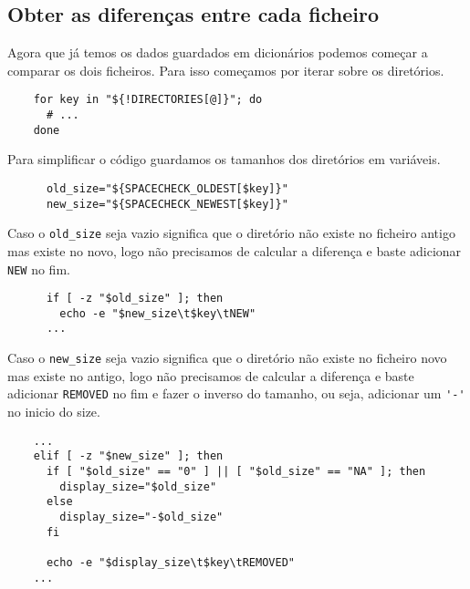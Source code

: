 \subsection{Obter as diferenças entre cada ficheiro}

Agora que já temos os dados guardados em dicionários podemos começar a comparar os dois ficheiros.
Para isso começamos por iterar sobre os diretórios.

\begin{listing}[H]
	\centering
	\begin{verbatim}
    for key in "${!DIRECTORIES[@]}"; do
      # ...
    done
  \end{verbatim}
\end{listing}

Para simplificar o código guardamos os tamanhos dos diretórios em variáveis.

\begin{listing}[H]
	\centering
	\begin{verbatim}
      old_size="${SPACECHECK_OLDEST[$key]}"
      new_size="${SPACECHECK_NEWEST[$key]}"
  \end{verbatim}
\end{listing}

Caso o \Verb|old_size| seja vazio significa que o diretório não existe no ficheiro antigo mas existe no novo, logo não precisamos de calcular a diferença e baste adicionar \Verb|NEW| no fim.

\begin{listing}[H]
	\centering
	\begin{verbatim}
      if [ -z "$old_size" ]; then
        echo -e "$new_size\t$key\tNEW"
      ...
  \end{verbatim}
\end{listing}

Caso o \Verb|new_size| seja vazio significa que o diretório não existe no ficheiro novo mas existe no antigo, logo não precisamos de calcular a diferença e baste adicionar \Verb|REMOVED| no fim e fazer o inverso do tamanho, ou seja, adicionar um \Verb|'-'| no inicio do size.

\begin{listing}[H]
	\centering
	\begin{verbatim}
    ...
    elif [ -z "$new_size" ]; then
      if [ "$old_size" == "0" ] || [ "$old_size" == "NA" ]; then
        display_size="$old_size"
      else
        display_size="-$old_size"
      fi

      echo -e "$display_size\t$key\tREMOVED"
    ...
  \end{verbatim}
\end{listing}


